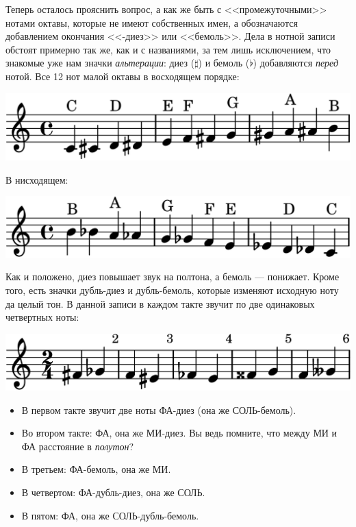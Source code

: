 Теперь осталось прояснить вопрос, а как же быть с <<промежуточными>> нотами октавы, которые не имеют собственных имен, а обозначаются добавлением окончания <<-диез>> или <<бемоль>>. Дела в нотной записи обстоят примерно так же, как и с названиями, за тем лишь исключением, что знакомые уже нам значки \emph{альтерации}: диез ($\sharp$) и бемоль ($\flat$) добавляются \emph{перед} нотой. Все 12 нот малой октавы в восходящем порядке:
\begin{center}    
    \includegraphics{fig/notes/octave-all-up}
\end{center}

В нисходящем:
\begin{center}    
    \includegraphics{fig/notes/octave-all-dn}
\end{center}

Как и положено, диез повышает звук на полтона, а бемоль --- понижает. Кроме того, есть значки дубль-диез и дубль-бемоль, которые изменяют исходную ноту да целый тон. В данной записи в каждом такте звучит по две одинаковых четвертных ноты:
\begin{center}    
    \includegraphics{fig/notes/sharp-flat}
\end{center}

\begin{itemize}
    \item В первом такте звучит две ноты ФА-диез (она же СОЛЬ-бемоль).
    \item Во втором такте: ФА, она же МИ-диез. Вы ведь помните, что между МИ и ФА расстояние в \emph{полутон}?
    \item В третьем: ФА-бемоль, она же МИ.
    \item В четвертом: ФА-дубль-диез, она же СОЛЬ.
    \item В пятом: ФА, она же СОЛЬ-дубль-бемоль.
\end{itemize}

